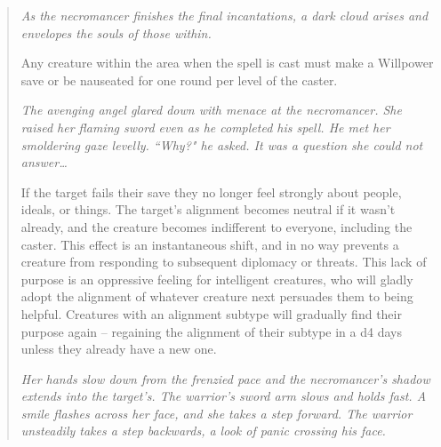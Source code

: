 \begin{quote}

\begin{small}
\end{small}
\emph{As the necromancer finishes the final incantations, a dark cloud arises and envelopes the souls of those within.}

Any creature within the area when the spell is cast must make a Willpower save or be nauseated for one round per level of the caster.\\

\begin{small}
\end{small}
\emph{The avenging angel glared down with menace at the necromancer. She raised her flaming sword even as he completed his spell. He met her smoldering gaze levelly. ``Why?" he asked. It was a question she could not answer\ldots}

If the target fails their save they no longer feel strongly about people, ideals, or things. The target's alignment becomes neutral if it wasn't already, and the creature becomes indifferent to everyone, including the caster. This effect is an instantaneous shift, and in no way prevents a creature from responding to subsequent diplomacy or threats. This lack of purpose is an oppressive feeling for intelligent creatures, who will gladly adopt the alignment of whatever creature next persuades them to being helpful. Creatures with an alignment subtype will gradually find their purpose again -- regaining the alignment of their subtype in a d4 days unless they already have a new one.\\

\begin{small}
\end{small}
\emph{Her hands slow down from the frenzied pace and the necromancer's shadow extends into the target's. The warrior's sword arm slows and holds fast. A smile flashes across her face, and she takes a step forward. The warrior unsteadily takes a step backwards, a look of panic crossing his face.}


\end{quote}
